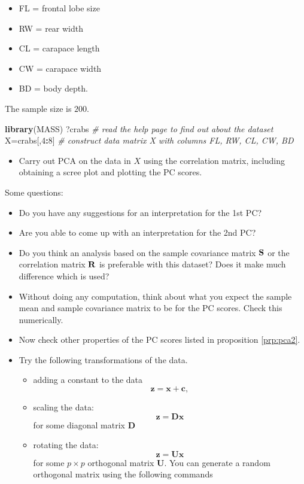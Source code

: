 \documentclass[
]{book}
\newenvironment{Shaded}{\begin{snugshade}}{\end{snugshade}}
\newcommand{\CommentTok}[1]{\textcolor[rgb]{0.56,0.35,0.01}{\textit{#1}}}
\newcommand{\DecValTok}[1]{\textcolor[rgb]{0.00,0.00,0.81}{#1}}
\newcommand{\FunctionTok}[1]{\textcolor[rgb]{0.13,0.29,0.53}{\textbf{#1}}}
\newcommand{\NormalTok}[1]{#1}
\newcommand{\OtherTok}[1]{\textcolor[rgb]{0.56,0.35,0.01}{#1}}
\newcommand{\SpecialCharTok}[1]{\textcolor[rgb]{0.81,0.36,0.00}{\textbf{#1}}}
\providecommand{\tightlist}{%
  \setlength{\itemsep}{0pt}\setlength{\parskip}{0pt}}
\theoremstyle{definition}
\theoremstyle{definition}
\theoremstyle{definition}
\theoremstyle{definition}
\theoremstyle{remark}
\begin{document}
\begin{itemize}
\tightlist
\item
  FL = frontal lobe size
\item
  RW = rear width
\item
  CL = carapace length
\item
  CW = carapace width
\item
  BD = body depth.
\end{itemize}

The sample size is \(200\).

\begin{Shaded}
\begin{Highlighting}[]
\FunctionTok{library}\NormalTok{(MASS)}
\NormalTok{?crabs }\CommentTok{\# read the help page to find out about the dataset}
\NormalTok{X}\OtherTok{=}\NormalTok{crabs[,}\DecValTok{4}\SpecialCharTok{:}\DecValTok{8}\NormalTok{]     }
\CommentTok{\# construct data matrix X with columns FL, RW, CL, CW, BD}
\end{Highlighting}
\end{Shaded}

\begin{itemize}
\tightlist
\item
  Carry out PCA on the data in \(X\) using the correlation matrix, including obtaining a scree plot and plotting the PC scores.
\end{itemize}

Some questions:

\begin{itemize}
\item
  Do you have any suggestions for an interpretation for the 1st PC?
\item
  Are you able to come up with an interpretation for the 2nd PC?
\item
  Do you think an analysis based on the sample covariance matrix \({\bf S}\) or the
  correlation matrix \({\bf R}\) is preferable with this dataset? Does it make much difference which is used?
\item
  Without doing any computation, think about what you expect the sample mean and sample covariance matrix to be for the PC scores. Check this numerically.
\item
  Now check other properties of the PC scores listed in proposition \ref{prp:pca2}.
\item
  Try the following transformations of the data.

  \begin{itemize}
  \item
    adding a constant to the data
    \[\mathbf z= \mathbf x+\mathbf c,\]
  \item
    scaling the data:
    \[\mathbf z= \mathbf D\mathbf x\]
    for some diagonal matrix \(\mathbf D\)
  \item
    rotating the data:
    \[\mathbf z= \mathbf U\mathbf x\]
    for some \(p\times p\) orthogonal matrix \(\mathbf U\).
    You can generate a random orthogonal matrix using the following commands
  \end{itemize}
\end{itemize}
\end{document}
